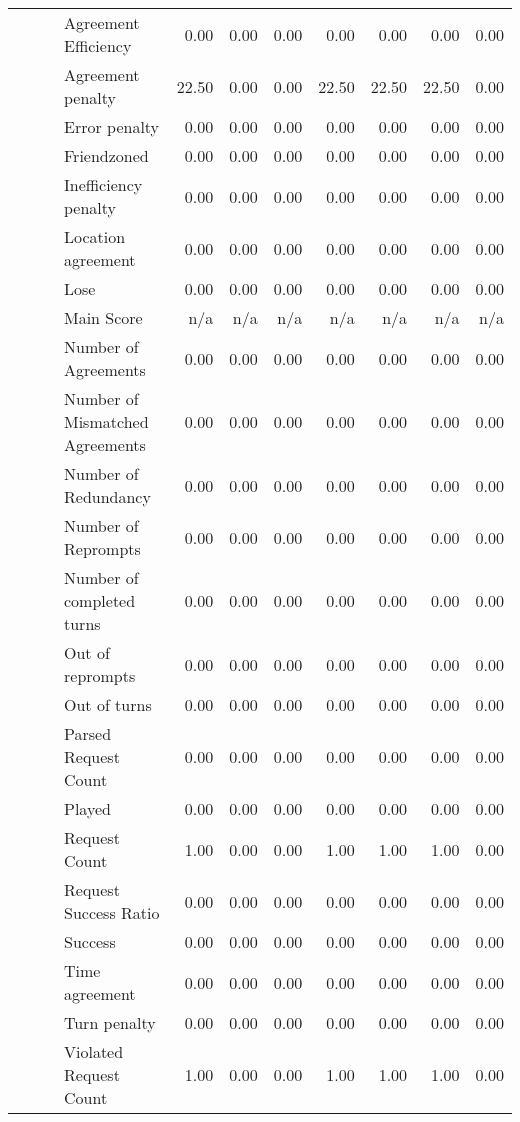 \begin{tabular}{llllrrrrrrr}
 &  &  & Agreement Efficiency & 0.00 & 0.00 & 0.00 & 0.00 & 0.00 & 0.00 & 0.00 \\
 &  &  & Agreement penalty & 22.50 & 0.00 & 0.00 & 22.50 & 22.50 & 22.50 & 0.00 \\
 &  &  & Error penalty & 0.00 & 0.00 & 0.00 & 0.00 & 0.00 & 0.00 & 0.00 \\
 &  &  & Friendzoned & 0.00 & 0.00 & 0.00 & 0.00 & 0.00 & 0.00 & 0.00 \\
 &  &  & Inefficiency penalty & 0.00 & 0.00 & 0.00 & 0.00 & 0.00 & 0.00 & 0.00 \\
 &  &  & Location agreement & 0.00 & 0.00 & 0.00 & 0.00 & 0.00 & 0.00 & 0.00 \\
 &  &  & Lose & 0.00 & 0.00 & 0.00 & 0.00 & 0.00 & 0.00 & 0.00 \\
 &  &  & Main Score & n/a & n/a & n/a & n/a & n/a & n/a & n/a \\
 &  &  & Number of Agreements & 0.00 & 0.00 & 0.00 & 0.00 & 0.00 & 0.00 & 0.00 \\
 &  &  & Number of Mismatched Agreements & 0.00 & 0.00 & 0.00 & 0.00 & 0.00 & 0.00 & 0.00 \\
 &  &  & Number of Redundancy & 0.00 & 0.00 & 0.00 & 0.00 & 0.00 & 0.00 & 0.00 \\
 &  &  & Number of Reprompts & 0.00 & 0.00 & 0.00 & 0.00 & 0.00 & 0.00 & 0.00 \\
 &  &  & Number of completed turns & 0.00 & 0.00 & 0.00 & 0.00 & 0.00 & 0.00 & 0.00 \\
 &  &  & Out of reprompts & 0.00 & 0.00 & 0.00 & 0.00 & 0.00 & 0.00 & 0.00 \\
 &  &  & Out of turns & 0.00 & 0.00 & 0.00 & 0.00 & 0.00 & 0.00 & 0.00 \\
 &  &  & Parsed Request Count & 0.00 & 0.00 & 0.00 & 0.00 & 0.00 & 0.00 & 0.00 \\
 &  &  & Played & 0.00 & 0.00 & 0.00 & 0.00 & 0.00 & 0.00 & 0.00 \\
 &  &  & Request Count & 1.00 & 0.00 & 0.00 & 1.00 & 1.00 & 1.00 & 0.00 \\
 &  &  & Request Success Ratio & 0.00 & 0.00 & 0.00 & 0.00 & 0.00 & 0.00 & 0.00 \\
 &  &  & Success & 0.00 & 0.00 & 0.00 & 0.00 & 0.00 & 0.00 & 0.00 \\
 &  &  & Time agreement & 0.00 & 0.00 & 0.00 & 0.00 & 0.00 & 0.00 & 0.00 \\
 &  &  & Turn penalty & 0.00 & 0.00 & 0.00 & 0.00 & 0.00 & 0.00 & 0.00 \\
 &  &  & Violated Request Count & 1.00 & 0.00 & 0.00 & 1.00 & 1.00 & 1.00 & 0.00 \\

\end{tabular}
